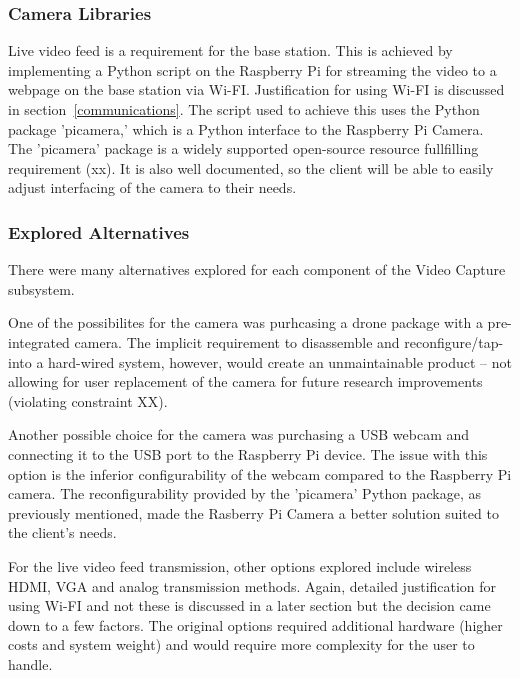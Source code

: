 \subsubsection{Camera Libraries}
Live video feed is a requirement for the base station. This is achieved by implementing a Python script on the Raspberry Pi for streaming the video to a webpage on the base station via Wi-FI. Justification for using Wi-FI is discussed in section~\ref{communications}. The script used to achieve this uses the Python package 'picamera,' which is a Python interface to the Raspberry Pi Camera. The 'picamera' package is a widely supported open-source resource fullfilling requirement (xx). It is also well documented, so the client will be able to easily adjust interfacing of the camera to their needs.

\subsubsection{Explored Alternatives}
There were many alternatives explored for each component of the Video Capture subsystem.

One of the possibilites for the camera was purhcasing a drone package with a pre-integrated camera. The implicit requirement to disassemble and reconfigure/tap-into a hard-wired system, however, would create an unmaintainable product -- not allowing for user replacement of the camera for future research improvements (violating constraint XX). %

Another possible choice for the camera was purchasing a USB webcam and connecting it to the USB port to the Raspberry Pi device. The issue with this option is the inferior configurability of the webcam compared to the Raspberry Pi camera. The reconfigurability provided by the 'picamera' Python package, as previously mentioned, made the Rasberry Pi Camera a better solution suited to the client's needs.

For the live video feed transmission, other options explored include wireless HDMI, VGA and analog transmission methods. Again, detailed justification for using Wi-FI and not these is discussed in a later section but the decision came down to a few factors. The original options required additional hardware (higher costs and system weight) and would require more complexity for the user to handle.
